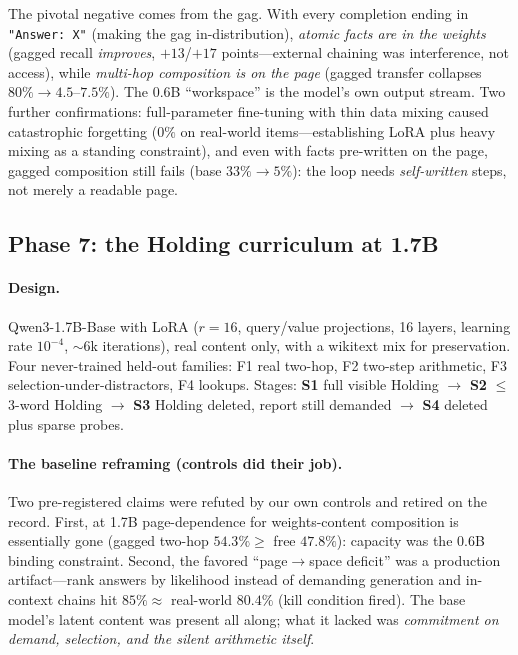 \documentclass[11pt]{article}
\newcommand{\pct}{\%}
\begin{document}
The pivotal negative comes from the gag. With every completion ending in
\texttt{"Answer: X"} (making the gag in-distribution), \emph{atomic facts are in
the weights} (gagged recall \emph{improves}, $+13$/$+17$ points---external
chaining was interference, not access), while \emph{multi-hop composition is on
the page} (gagged transfer collapses $80\pct{\to}4.5$--$7.5\pct$). The 0.6B
``workspace'' is the model's own output stream. Two further confirmations:
full-parameter fine-tuning with thin data mixing caused catastrophic forgetting
($0\pct$ on real-world items---establishing LoRA plus heavy mixing as a standing
constraint), and even with facts pre-written on the page, gagged composition
still fails (base $33\pct{\to}5\pct$): the loop needs \emph{self-written} steps,
not merely a readable page.

\subsection{Phase 7: the Holding curriculum at 1.7B}

\paragraph{Design.} Qwen3-1.7B-Base with LoRA ($r{=}16$, query/value projections,
16 layers, learning rate $10^{-4}$, $\sim$6k iterations), real content only, with
a wikitext mix for preservation. Four never-trained held-out families: F1 real
two-hop, F2 two-step arithmetic, F3 selection-under-distractors, F4 lookups.
Stages: \textbf{S1} full visible Holding $\to$ \textbf{S2} $\leq$3-word Holding
$\to$ \textbf{S3} Holding deleted, report still demanded $\to$ \textbf{S4} deleted
plus sparse probes.

\paragraph{The baseline reframing (controls did their job).} Two pre-registered
claims were refuted by our own controls and retired on the record. First, at 1.7B
page-dependence for weights-content composition is essentially gone (gagged
two-hop $54.3\pct \geq$ free $47.8\pct$): capacity was the 0.6B binding
constraint. Second, the favored ``page$\to$space deficit'' was a production
artifact---rank answers by likelihood instead of demanding generation and
in-context chains hit $85\pct \approx$ real-world $80.4\pct$ (kill condition
fired). The base model's latent content was present all along; what it lacked was
\emph{commitment on demand, selection, and the silent arithmetic itself}.
\end{document}
